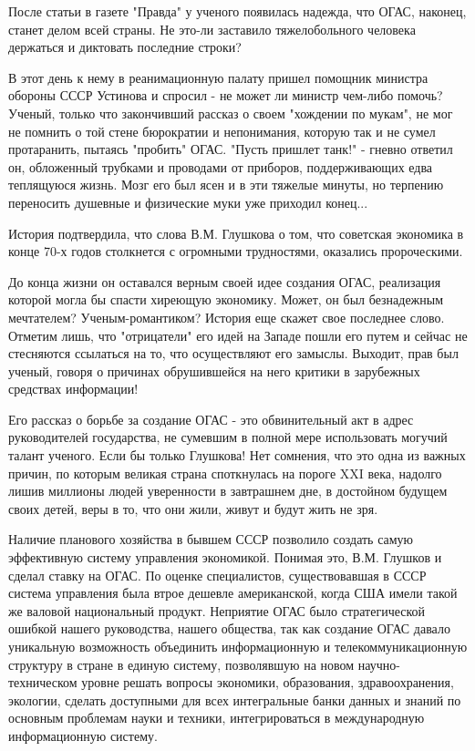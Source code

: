 \documentclass{article}
\begin{document}
После статьи в газете "Правда" у ученого появилась надежда, что ОГАС, наконец,
станет делом всей страны. Не это-ли заставило тяжелобольного человека держаться
и диктовать последние строки?

В этот день к нему в реанимационную палату пришел помощник министра обороны СССР
Устинова и спросил - не может ли министр чем-либо помочь? Ученый, только что
закончивший рассказ о своем "хождении по мукам", не мог не помнить о той стене
бюрократии и непонимания, которую так и не сумел протаранить, пытаясь "пробить"
ОГАС. "Пусть пришлет танк!" - гневно ответил он, обложенный трубками и проводами
от приборов, поддерживающих едва теплящуюся жизнь. Мозг его был ясен и в эти
тяжелые минуты, но терпению переносить душевные и физические муки уже приходил
конец...

История подтвердила, что слова В.М. Глушкова о том, что советская экономика в
конце 70-х годов столкнется с огромными трудностями, оказались пророческими.

До конца жизни он оставался верным своей идее создания ОГАС, реализация которой
могла бы спасти хиреющую экономику. Может, он был безнадежным мечтателем?
Ученым-романтиком? История еще скажет свое последнее слово. Отметим лишь, что
"отрицатели" его идей на Западе пошли его путем и сейчас не стесняются ссылаться
на то, что осуществляют его замыслы. Выходит, прав был ученый, говоря о причинах
обрушившейся на него критики в зарубежных средствах информации!

Его рассказ о борьбе за создание ОГАС - это обвинительный акт в адрес
руководителей государства, не сумевшим в полной мере использовать могучий талант
ученого. Если бы только Глушкова! Нет сомнения, что это одна из важных причин,
по которым великая страна споткнулась на пороге XXI века, надолго лишив миллионы
людей уверенности в завтрашнем дне, в достойном будущем своих детей, веры в то,
что они жили, живут и будут жить не зря.

Наличие планового хозяйства в бывшем СССР позволило создать самую эффективную
систему управления экономикой. Понимая это, В.М. Глушков и сделал ставку на
ОГАС. По оценке специалистов, существовавшая в СССР система управления была
втрое дешевле американской, когда США имели такой же валовой национальный
продукт. Неприятие ОГАС было стратегической ошибкой нашего руководства, нашего
общества, так как создание ОГАС давало уникальную возможность объединить
информационную и телекоммуникационную структуру в стране в единую систему,
позволявшую на новом научно-техническом уровне решать вопросы экономики,
образования, здравоохранения, экологии, сделать доступными для всех интегральные
банки данных и знаний по основным проблемам науки и техники, интегрироваться в
международную информационную систему.
\end{document}
